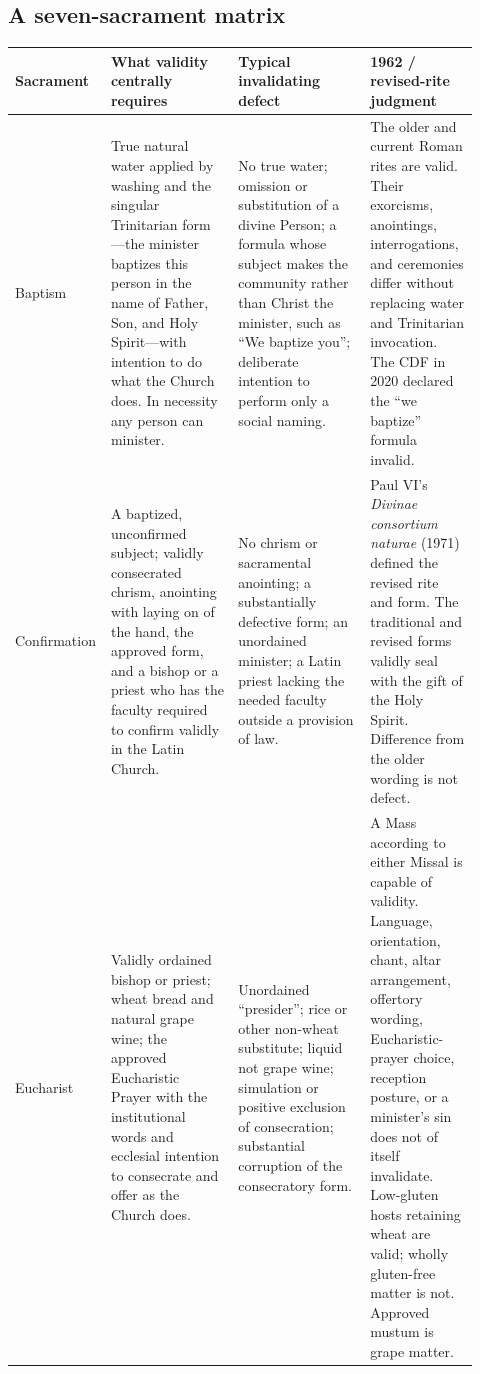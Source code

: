 \subsection{A seven-sacrament matrix}

\begin{longtable}{>{\bfseries\raggedright\arraybackslash}p{0.13\linewidth}>{\raggedright\arraybackslash}p{0.27\linewidth}>{\raggedright\arraybackslash}p{0.29\linewidth}>{\raggedright\arraybackslash}p{0.23\linewidth}}
\toprule
\textbf{Sacrament} & \textbf{What validity centrally requires} & \textbf{Typical invalidating defect} & \textbf{1962 / revised-rite judgment}\\
\midrule
\endhead
Baptism & True natural water applied by washing and the singular Trinitarian form---the minister baptizes this person in the name of Father, Son, and Holy Spirit---with intention to do what the Church does. In necessity any person can minister. & No true water; omission or substitution of a divine Person; a formula whose subject makes the community rather than Christ the minister, such as “We baptize you”; deliberate intention to perform only a social naming. & The older and current Roman rites are valid. Their exorcisms, anointings, interrogations, and ceremonies differ without replacing water and Trinitarian invocation. The CDF in 2020 declared the “we baptize” formula invalid.\\
Confirmation & A baptized, unconfirmed subject; validly consecrated chrism, anointing with laying on of the hand, the approved form, and a bishop or a priest who has the faculty required to confirm validly in the Latin Church. & No chrism or sacramental anointing; a substantially defective form; an unordained minister; a Latin priest lacking the needed faculty outside a provision of law. & Paul VI's \emph{Divinae consortium naturae} (1971) defined the revised rite and form. The traditional and revised forms validly seal with the gift of the Holy Spirit. Difference from the older wording is not defect.\\
Eucharist & Validly ordained bishop or priest; wheat bread and natural grape wine; the approved Eucharistic Prayer with the institutional words and ecclesial intention to consecrate and offer as the Church does. & Unordained “presider”; rice or other non-wheat substitute; liquid not grape wine; simulation or positive exclusion of consecration; substantial corruption of the consecratory form. & A Mass according to either Missal is capable of validity. Language, orientation, chant, altar arrangement, offertory wording, Eucharistic-prayer choice, reception posture, or a minister's sin does not of itself invalidate. Low-gluten hosts retaining wheat are valid; wholly gluten-free matter is not. Approved mustum is grape matter.\\

\end{longtable}
